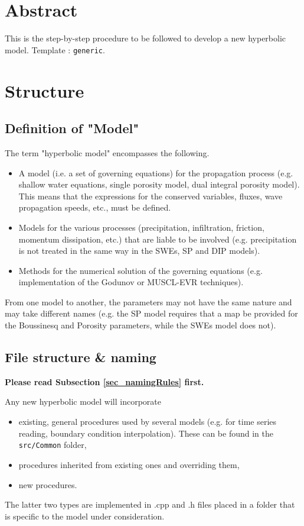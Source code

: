 \section{Abstract}
This is the step-by-step procedure to be followed to develop a new hyperbolic model. Template : \texttt{generic}.
%
%
%
%
\section{Structure}
%
%
%
\subsection{Definition of "Model"}
The term "hyperbolic model" encompasses the following.
\begin{itemize}
\item A model (i.e. a set of governing equations) for the propagation process (e.g. shallow water equations, single porosity model, dual integral porosity model). This means that the expressions for the conserved variables, fluxes, wave propagation speeds, etc., must be defined.
\item Models for the various processes (precipitation, infiltration, friction, momentum dissipation, etc.) that are liable to be involved (e.g. precipitation is not treated in the same way in the SWEs, SP and DIP models).
\item Methods for the numerical solution of the governing equations (e.g. implementation of the Godunov or MUSCL-EVR techniques).
\end{itemize}
From one model to another, the parameters may not have the same nature and may take different names (e.g. the SP model requires that a map be provided for the Boussinesq and Porosity parameters, while the SWEs model does not).
%
%
%
\subsection{File structure \& naming}
\textbf{Please read Subsection  \ref{sec_namingRules} first.}


Any new hyperbolic model will incorporate 
\begin{itemize}
\item existing, general procedures used by several models (e.g. for time series reading, boundary condition interpolation). These can be found in the \texttt{src/Common} folder,
\item procedures inherited from existing ones and overriding them,
 \item new procedures.\\
\end{itemize}
The latter two types are implemented in .cpp and .h files placed in a folder that is specific to the model under consideration.

